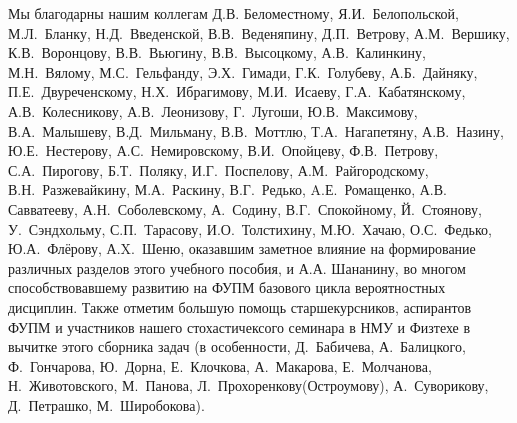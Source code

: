 Мы благодарны нашим коллегам Д.В. Беломестному, Я.И.~Белопольской, М.Л.~Бланку, Н.Д.~Введенской, В.В.~Веденяпину, Д.П.~Ветрову, А.М.~Вершику, К.В.~Воронцову, В.В.~Вьюгину, В.В.~Высоцкому, А.В.~Калинкину, М.Н.~Вялому, М.С.~Гельфанду, Э.Х.~Гимади, Г.К.~Голубеву, А.Б.~Дайняку, П.Е.~Двуреченскому, Н.Х.~Ибрагимову, М.И.~Исаеву, Г.А.~Кабатянскому, А.В.~Колесникову, А.В.~Леонизову, Г.~Лугоши, Ю.В.~Максимову, В.А.~Малышеву, В.Д.~Мильману, В.В.~Моттлю, Т.А.~Нагапетяну, А.В.~Назину, Ю.Е.~Нестерову, А.С.~Немировскому, В.И.~Опойцеву, Ф.В.~Петрову, С.А.~Пирогову, Б.Т.~Поляку, И.Г.~Поспелову, А.М.~Райгородскому, В.Н.~Разжевайкину, М.А.~Раскину, В.Г.~Редько, A.Е.~Ромащенко, А.В. Савватееву, А.Н.~Соболевскому, А.~Содину, В.Г.~Спокойному, Й.~Стоянову, У.~Сэндхольму, С.П.~Тарасову, И.О.~Толстихину, М.Ю.~Хачаю, О.С.~Федько, Ю.А.~Флёрову, А.X.~Шеню, оказавшим заметное влияние на формирование различных разделов этого учебного пособия, и А.А. Шананину, во многом способствовавшему развитию на ФУПМ базового цикла вероятностных дисциплин. Также отметим большую помощь старшекурсников, аспирантов ФУПМ и участников нашего стохастичексого семинара в НМУ и Физтехе в вычитке этого сборника задач (в особенности, Д.~Бабичева, А.~Балицкого, Ф.~Гончарова, Ю.~Дорна, Е.~Клочкова, А.~Макарова, Е.~Молчанова, Н.~Животовского, М.~Панова, Л.~Прохоренкову(Остроумову), А.~Суворикову, Д.~Петрашко, М.~Широбокова).